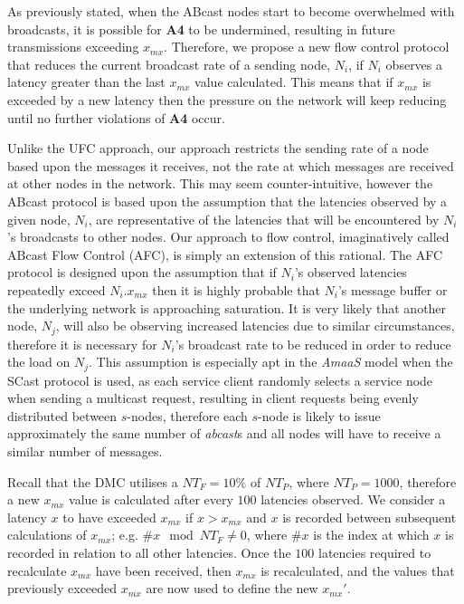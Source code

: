     As previously stated, when the \textsf{ABcast} nodes start to become overwhelmed with broadcasts, it is possible for \textbf{A4} to be undermined, resulting in future transmissions exceeding $x_{mx}$.  Therefore, we propose a new flow control protocol that reduces the current broadcast rate of a sending node, $N_i$, if $N_i$ observes a latency greater than the last $x_{mx}$ value calculated.  This means that if $x_{mx}$ is exceeded by a new latency then the pressure on the network will keep reducing until no further violations of \textbf{A4} occur.  
    
    Unlike the \textsf{UFC} approach, our approach restricts the sending rate of a node based upon the messages it receives, not the rate at which messages are received at other nodes in the network.  This may seem counter-intuitive, however the \textsf{ABcast} protocol is based upon the assumption that the latencies observed by a given node, $N_i$, are representative of the latencies that will be encountered by $N_i$'s broadcasts to other nodes.  Our approach to flow control, imaginatively called ABcast Flow Control (AFC), is simply an extension of this rational.  The AFC protocol is designed upon the assumption that if $N_i$'s observed latencies repeatedly exceed $N_i.x_{mx}$ then it is highly probable that $N_i$'s message buffer or the underlying network is approaching saturation.  It is very likely that another node, $N_j$, will also be observing increased latencies due to similar circumstances, therefore it is necessary for $N_i$'s broadcast rate to be reduced in order to reduce the load on $N_j$.  This assumption is especially apt in the \emph{AmaaS} model when the \textsf{SCast} protocol is used, as each service client randomly selects a service node when sending a multicast request, resulting in client requests being evenly distributed between $s$-nodes, therefore each $s$-node is likely to issue approximately the same number of \emph{abcast}s and all nodes will have to receive a similar number of messages.          
        
    Recall that the DMC utilises a $NT_F = 10\%$ of $NT_P$, where $NT_P = 1000$, therefore a new $x_{mx}$ value is calculated after every $100$ latencies observed.  We consider a latency $x$ to have exceeded $x_{mx}$ if $x > x_{mx}$ and $x$ is recorded between subsequent calculations of $x_{mx}$; e.g. $\#x \mod NT_F \neq 0$, where $\#x$ is the index at which $x$ is recorded in relation to all other latencies.  Once the $100$ latencies required to recalculate $x_{mx}$ have been received, then $x_{mx}$ is recalculated, and the values that previously exceeded $x_{mx}$ are now used to define the new $x_{mx}'$. 
    
